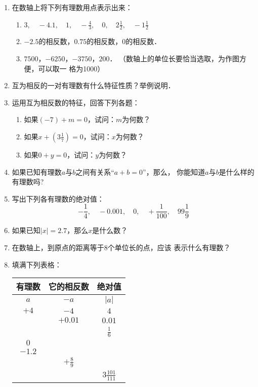 \begin{enumerate}
	
	\item 在数轴上将下列有理数用点表示出来：
	\begin{enumerate}
		\item $3,\quad -4.1,\quad 1,\quad -\frac{4}{3},\quad 0,\quad 2\frac{1}{2},\quad -1\frac{1}{2}$
		\item $-2.5$的相反数，$0.75$的相反数，0的相反数．
		\item $7500$，$-6250$，$-3750$，$200$．
		（数轴上的单位长要恰当选取，为作图方便，可以取一
		格为1000）
	\end{enumerate}
	
	
	\item 互为相反的一对有理数有什么特征性质？举例说明．
	\item 运用互为相反数的特征，回答下列各题：
	\begin{enumerate}
		\item 如果$(-7) +m=0$，试问：$m$为何数？
		\item 如果$x+\left(3\frac{1}{7}\right)=0$，试问：$x$为何数？
		\item 如果$0+y=0$，试问：$y$为何数？
	\end{enumerate}
	
	
	\item 如果已知有理数$a$与$b$之间有关系“$a+b=0$”，那么，
	你能知道$a$与$b$是什么样的有理数吗?
	\item 写出下列各有理数的绝对值：
	\[-\frac{1}{4},\quad -0.001,\quad 0,\quad +\frac{1}{100},\quad 99\frac{1}{9}\]
	
	\item 如果已知$|x|= 2.7$，那么$x$是什么数？
	\item 在数轴上，到原点的距离等于8个单位长的点，应该
	表示什么有理数？
	\item 填满下列表格：
	\begin{center}
		\begin{tabular}{ccc}
			\hline
			有理数&它的相反数&绝对值\\
			\hline
			$a$  &   $-a$   &   $|a|$\\ 
			$+4$  &   $-4$   &   $4$\\ 
			&   $+0.01$   &   $0.01$\\ 
			&      &   $\frac{1}{6}$\\ 
			$0$  &      &   \\ 
			$-1.2$  &      &   \\ 
			&   $+\frac{8}{9}$   &   \\ 
			&      &   $3\frac{101}{111}$\\ 
			\hline
		\end{tabular}
	\end{center}
	

\end{enumerate}
